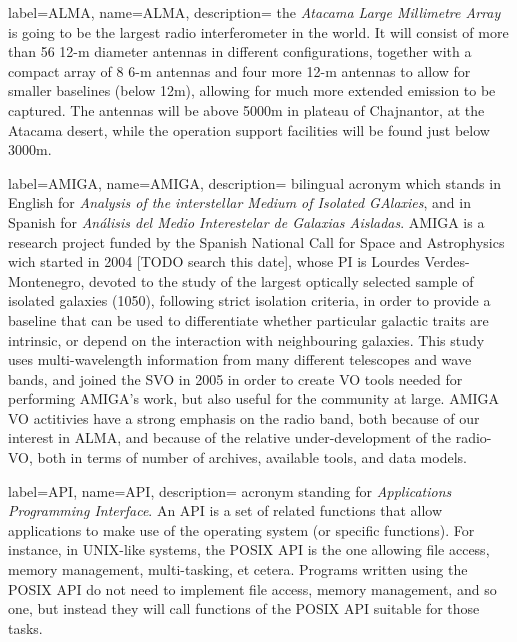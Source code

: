 \usepackage{glossaries}

\makeglossaries

{
    label={ALMA},
    name={ALMA},
    description={
    	the \emph{Atacama Large Millimetre Array} is going to be the
        largest radio interferometer in the world. It will consist of
        more than 56 12-m diameter antennas in different
        configurations, together with a compact array of 8 6-m antennas
        and four more 12-m antennas to allow for smaller baselines
        (below 12m), allowing for much more extended emission to be
        captured. The antennas will be above 5000m in plateau of
        Chajnantor, at the Atacama desert, while the operation support
        facilities will be found just below 3000m.
    }
}

{
    label={AMIGA},
    name={AMIGA},
    description={
    	bilingual acronym which stands in English for \emph{Analysis of
        the interstellar Medium of Isolated GAlaxies}, and in Spanish
        for \emph{Análisis del Medio Interestelar de Galaxias
        Aisladas}. AMIGA is a research project funded by the Spanish
        National Call for Space and Astrophysics wich started in 2004
        [TODO search this date], whose PI is Lourdes Verdes-Montenegro,
        devoted to the study of the largest optically selected sample
        of isolated galaxies (1050), following strict isolation
        criteria, in order to provide a baseline that can be used to
        differentiate whether particular galactic traits are intrinsic,
        or depend on the interaction with neighbouring galaxies. This
        study uses multi-wavelength information from many different
        telescopes and wave bands, and joined the \gls{SVO} in 2005
        in order to create \gls{VO} tools needed for performing
        AMIGA's work, but also useful for the community at large. AMIGA
        VO actitivies have a strong emphasis on the radio band, both
        because of our interest in \gls{ALMA}, and because of the
        relative under-development of the radio-VO, both in terms of
        number of archives, available tools, and data models.
    }
}

{
    label={API},
    name={API},
    description={
    	acronym standing for \emph{Applications Programming Interface}.
        An API is a set of related functions that allow applications to
        make use of the operating system (or specific functions). For
        instance, in UNIX-like systems, the POSIX API is the one
        allowing file access, memory management, multi-tasking, et cetera.
        Programs written using the POSIX API do not need to implement
        file access, memory management, and so one, but instead they
        will call functions of the POSIX API suitable for those tasks.
    }
}

